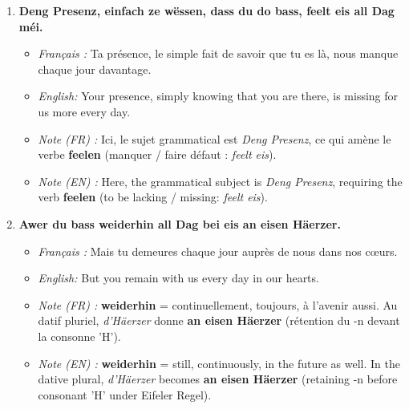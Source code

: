 \begin{enumerate}
    \item \textbf{Deng Presenz, einfach ze wëssen, dass du do bass, feelt eis all Dag méi.}
    \begin{itemize}
        \item \textit{Français :} Ta présence, le simple fait de savoir que tu es là, nous manque chaque jour davantage.
        \item \textit{English:} Your presence, simply knowing that you are there, is missing for us more every day.
        \item \textit{Note (FR) :} Ici, le sujet grammatical est \textit{Deng Presenz}, ce qui amène le verbe \textbf{feelen} (manquer / faire défaut : \textit{feelt eis}).
        \item \textit{Note (EN) :} Here, the grammatical subject is \textit{Deng Presenz}, requiring the verb \textbf{feelen} (to be lacking / missing: \textit{feelt eis}).
    \end{itemize}

    \vspace{0.6em}

    \item \textbf{Awer du bass weiderhin all Dag bei eis an eisen Häerzer.}
    \begin{itemize}
        \item \textit{Français :} Mais tu demeures chaque jour auprès de nous dans nos cœurs.
        \item \textit{English:} But you remain with us every day in our hearts.
        \item \textit{Note (FR) :} \textbf{weiderhin} = continuellement, toujours, à l'avenir aussi. Au datif pluriel, \textit{d'Häerzer} donne \textbf{an eisen Häerzer} (rétention du -n devant la consonne 'H').
        \item \textit{Note (EN) :} \textbf{weiderhin} = still, continuously, in the future as well. In the dative plural, \textit{d'Häerzer} becomes \textbf{an eisen Häerzer} (retaining -n before consonant 'H' under Eifeler Regel).
    \end{itemize}

    \vspace{0.6em}


\end{enumerate}
